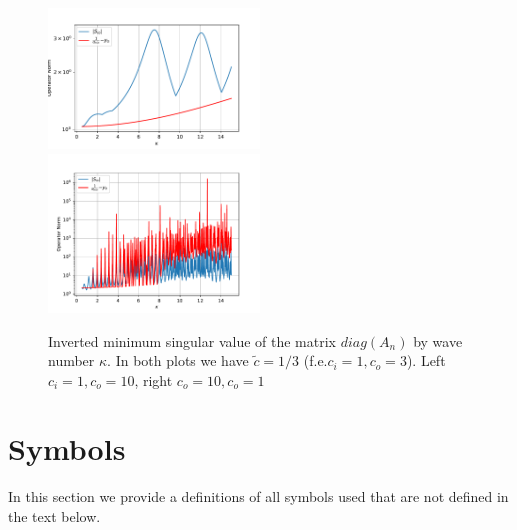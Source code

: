 \documentclass[10pt,journal,compsoc, onecolumn]{IEEEtran}
\begin{document}
\begin{figure}
    \includegraphics[width=0.5\textwidth]{InvertedMinimumSingularValuec_i1,0c_o10,0N_100eta1,0plotRangeStart_0,5plotRangeEnd_15,0indexrange_-2,0-0,0_y_0_49,44632486992498.pdf}
    \includegraphics[width=0.5\textwidth]{InvertedMinimumSingularValuec_i10,0c_o1,0N_100eta1,0plotRangeStart_0,5plotRangeEnd_15,0indexrange_-41,0-0,0_y_0_48,34921191495979.pdf}
    \caption{Inverted minimum singular value of the matrix $diag(A_n)$ by wave number $\kappa$. 
     In both plots we have $\tilde c = 1/3$ (f.e.$c_i = 1, c_o = 3$).
     Left $c_i = 1, c_o = 10$, right  $c_o = 10, c_o = 1$
    }
     \label{fig:vary_cs}
\end{figure}




\section*{Symbols}
In this section we provide a definitions of all symbols used that are not defined in the text below. 
\end{document}
